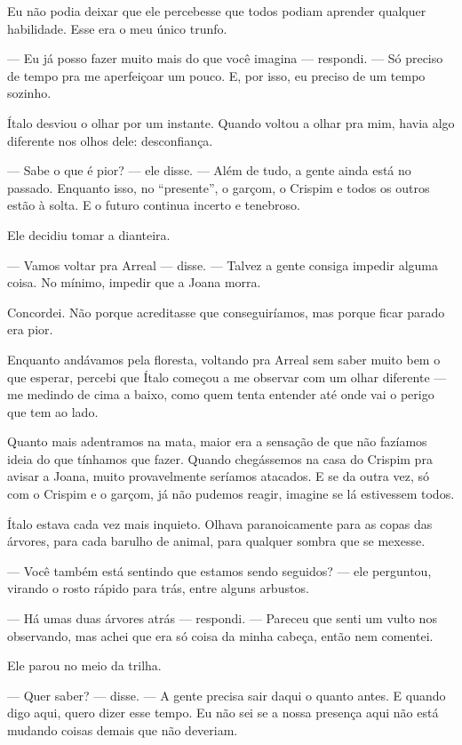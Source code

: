 Eu não podia deixar que ele percebesse que todos podiam aprender qualquer habilidade.  
Esse era o meu único trunfo.

— Eu já posso fazer muito mais do que você imagina — respondi. — Só preciso de tempo pra me aperfeiçoar um pouco. E, por isso, eu preciso de um tempo sozinho.

Ítalo desviou o olhar por um instante.  
Quando voltou a olhar pra mim, havia algo diferente nos olhos dele:  
desconfiança.

— Sabe o que é pior? — ele disse. — Além de tudo, a gente ainda está no passado.  
Enquanto isso, no “presente”, o garçom, o Crispim e todos os outros estão à solta.  
E o futuro continua incerto e tenebroso.

Ele decidiu tomar a dianteira.

— Vamos voltar pra Arreal — disse. — Talvez a gente consiga impedir alguma coisa.
No mínimo, impedir que a Joana morra.

Concordei.  
Não porque acreditasse que conseguiríamos, mas porque ficar parado era pior.

Enquanto andávamos pela floresta, voltando pra Arreal sem saber muito bem o que esperar, percebi que Ítalo começou a me observar com um olhar diferente — me medindo de cima a baixo, como quem tenta entender até onde vai o perigo que tem ao lado.

Quanto mais adentramos na mata, maior era a sensação de que não fazíamos ideia do que tínhamos que fazer.  
Quando chegássemos na casa do Crispim pra avisar a Joana, muito provavelmente seríamos atacados.  
E se da outra vez, só com o Crispim e o garçom, já não pudemos reagir, imagine se lá estivessem todos.

Ítalo estava cada vez mais inquieto.  
Olhava paranoicamente para as copas das árvores, para cada barulho de animal, para qualquer sombra que se mexesse.

— Você também está sentindo que estamos sendo seguidos? — ele perguntou, virando o rosto rápido para trás, entre alguns arbustos.

— Há umas duas árvores atrás — respondi. — Pareceu que senti um vulto nos observando, mas achei que era só coisa da minha cabeça, então nem comentei.

Ele parou no meio da trilha.

— Quer saber? — disse. — A gente precisa sair daqui o quanto antes.  
E quando digo aqui, quero dizer esse tempo.  
Eu não sei se a nossa presença aqui não está mudando coisas demais que não deveriam.

